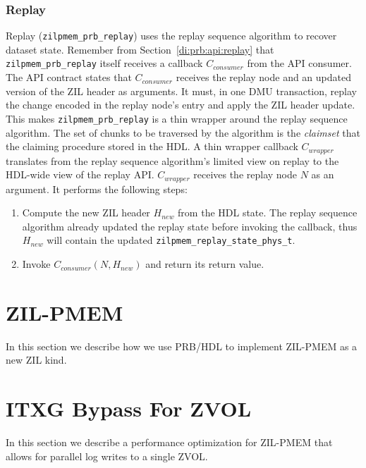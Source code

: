 \documentclass[12pt,a4paper,twoside]{book}
\begin{document}
\subsubsection{Replay}
Replay (\lstinline{zilpmem_prb_replay}) uses the replay sequence algorithm to recover dataset state.
Remember from Section~\ref{di:prb:api:replay} that \lstinline{zilpmem_prb_replay} itself receives a callback $C_{consumer}$ from the API consumer.
The API contract states that $C_{consumer}$ receives the replay node and an updated version of the ZIL header as arguments.
It must, in one DMU transaction, replay the change encoded in the replay node's entry and apply the ZIL header update.
This makes \lstinline{zilpmem_prb_replay} is a thin wrapper around the replay sequence algorithm.
The set of chunks to be traversed by the algorithm is the \textit{claimset} that the claiming procedure stored in the HDL.
A thin wrapper callback $C_{wrapper}$ translates from the replay sequence algorithm's limited view on replay to the HDL-wide view of the replay API.
$C_{wrapper}$ receives the replay node $N$ as an argument. It performs the following steps:
\begin{enumerate}
    \item Compute the new ZIL header $H_{new}$ from the HDL state.
        The replay sequence algorithm already updated the replay state before invoking the callback, thus $H_{new}$ will contain the updated \lstinline{zilpmem_replay_state_phys_t}.
    \item Invoke $C_{consumer}(N, H_{new})$ and return its return value.
\end{enumerate}

\section{ZIL-PMEM}\label{sec:zilpmem}
In this section we describe how we use PRB/HDL to implement ZIL-PMEM as a new ZIL kind.

\section{ITXG Bypass For ZVOL}\label{sec:itxgbypass}
In this section we describe a performance optimization for ZIL-PMEM that allows for parallel log writes to a single ZVOL.
\end{document}
